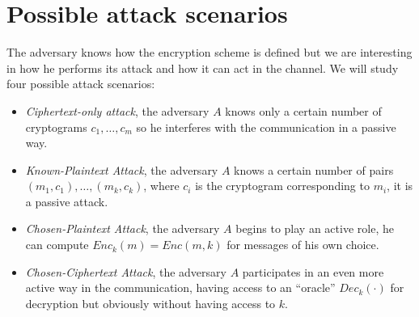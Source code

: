 \documentclass[../main]{subfiles}
\begin{document}
\section{Possible attack scenarios}
The adversary knows how the encryption scheme is defined but we are interesting in how he performs its attack and how it can act in the channel. We will study four possible attack scenarios:
\begin{itemize}
    \item \textit{Ciphertext-only attack}, the adversary $A$ knows only a certain number of cryptograms $c_1, \dotsc, c_m$ so he interferes with the communication in a passive way.
    \item \textit{Known-Plaintext Attack}, the adversary $A$ knows a certain number of pairs $(m_1, c_1), \dotsc{},(m_k, c_k)$, where $c_i$ is the cryptogram corresponding to $m_i$, it is a passive attack.
    \item \textit{Chosen-Plaintext Attack}, the adversary $A$ begins to play an active role, he can compute $Enc_k(m) = Enc(m, k)$ for messages of his own choice.
    \item \textit{Chosen-Ciphertext Attack}, the adversary $A$ participates in an even more active way in the communication, having access to an “oracle” $Dec_k(\cdot{})$ for decryption but obviously without having access to $k$.
\end{itemize}
\end{document}
